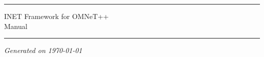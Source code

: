 

\begin{center}\end{center}
\vspace{16em}
\hrule
\vspace{2em}
\begin{center}
{\LARGE INET Framework for OMNeT++}\\
\vspace{1em}
{\large Manual}\\
\end{center}
\vspace{2em}
\hrule


\vspace{8em}

\begin{center}
\textit{Generated on \today}
\end{center}



